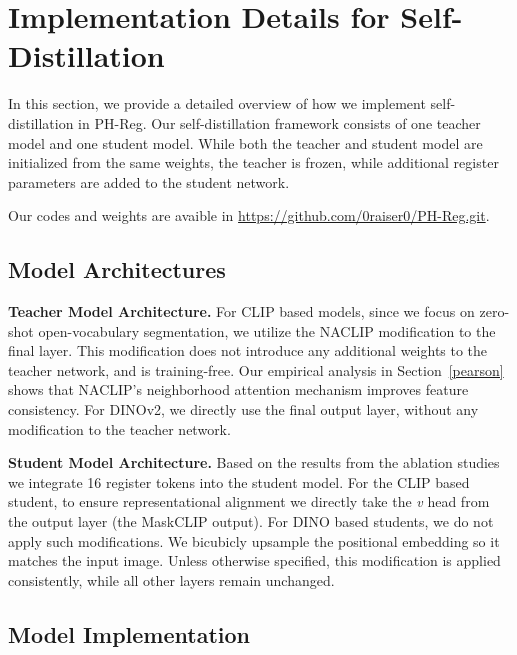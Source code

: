 \documentclass{article}
\begin{document}
\vspace{30em}

\section{Implementation Details for Self-Distillation}
\label{distillation}
\renewcommand{\arraystretch}{1.2}


In this section, we provide a detailed overview of how we implement self-distillation in PH-Reg. Our self-distillation framework consists of one teacher model and one student model. While both the teacher and student model are initialized from the same weights, the teacher is frozen, while additional register parameters are added to the student network. 

 Our codes and weights are avaible in \hyperlink{https://github.com/0raiser0/PH-Reg.git}{https://github.com/0raiser0/PH-Reg.git}. 


\subsection{Model Architectures}
\label{model}
\textbf{Teacher Model Architecture.}
For CLIP based models, since we focus on zero-shot open-vocabulary segmentation, we utilize the NACLIP modification to the final layer. This modification does not introduce any additional weights to the teacher network, and is training-free. Our empirical analysis in Section~\ref{pearson} shows that NACLIP's neighborhood attention mechanism improves feature consistency. For DINOv2, we directly use the final output layer, without any modification to the teacher network.


\textbf{Student Model Architecture.}
Based on the results from the ablation studies we integrate 16 register tokens into the student model. For the CLIP based student, to ensure representational alignment we directly take the \emph{v} head from the output layer (the MaskCLIP output). For DINO based students, we do not apply such modifications. We bicubicly upsample the positional embedding so it matches the input image. Unless otherwise specified, this modification is applied consistently, while all other layers remain unchanged.

\subsection{Model Implementation}
\label{weights}
\end{document}
